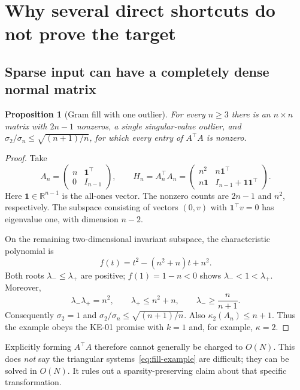 \documentclass[11pt,a4paper]{article}
\newcommand{\R}{\mathbb R}
\newcommand{\cond}{\kappa_2}
\newtheorem{proposition}[theorem]{Proposition}
\theoremstyle{definition}
\theoremstyle{remark}
\begin{document}
\section{Why several direct shortcuts do not prove the target}
\label{sec:shortcuts}
\subsection{Sparse input can have a completely dense normal matrix}
\begin{proposition}[Gram fill with one outlier]
\label{prop:fill}
For every $n\ge3$ there is an $n\times n$ matrix with $2n-1$ nonzeros, a single singular-value outlier, and $\sigma_2/\sigma_n\le\sqrt{(n+1)/n}$, for which every entry of $A^\top A$ is nonzero.
\end{proposition}
\begin{proof}
Take
\begin{equation}
 A_n=\begin{pmatrix}n&\mathbf1^\top\\0&I_{n-1}\end{pmatrix},\qquad
 H_n=A_n^\top A_n=
 \begin{pmatrix}n^2&n\mathbf1^\top\\n\mathbf1&I_{n-1}+\mathbf1\mathbf1^\top\end{pmatrix}.
 \label{eq:fill-example}
\end{equation}
Here $\mathbf1\in\R^{n-1}$ is the all-ones vector. The nonzero counts are $2n-1$ and $n^2$, respectively. The subspace consisting of vectors $(0,v)$ with $\mathbf1^\top v=0$ has eigenvalue one, with dimension $n-2$.

On the remaining two-dimensional invariant subspace, the characteristic polynomial is
\[
 f(t)=t^2-(n^2+n)t+n^2.
\]
Both roots $\lambda_-\le\lambda_+$ are positive; $f(1)=1-n<0$ shows $\lambda_-<1<\lambda_+$. Moreover,
\[
 \lambda_-\lambda_+=n^2,\qquad
 \lambda_+\le n^2+n,
 \qquad \lambda_-\ge\frac{n}{n+1}.
\]
Consequently $\sigma_2=1$ and
$\sigma_2/\sigma_n\le\sqrt{(n+1)/n}$. Also $\cond(A_n)\le n+1$. Thus the example obeys the KE-01 promise with $k=1$ and, for example, $\kappa=2$.
\end{proof}

Explicitly forming $A^\top A$ therefore cannot generally be charged to $O(N)$. This does \emph{not} say the triangular systems~\eqref{eq:fill-example} are difficult; they can be solved in $O(N)$. It rules out a sparsity-preserving claim about that specific transformation.
\end{document}
